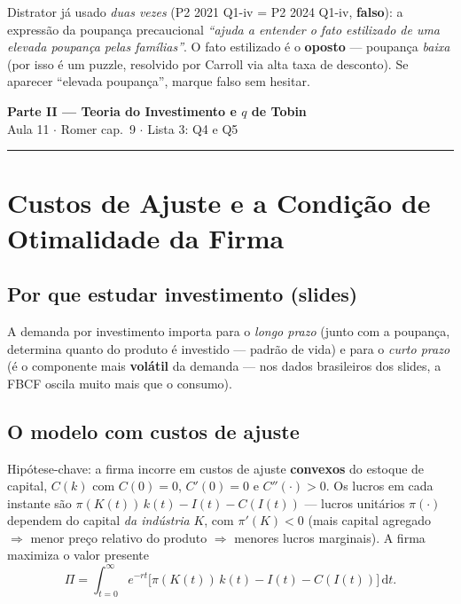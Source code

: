 \documentclass[12pt, a4paper]{article}
\newcommand{\dif}{\mathrm{d}}
\begin{document}
\begin{provabox}[title={Como cai na prova}]
Distrator já usado \emph{duas vezes} (P2 2021 Q1-iv = P2 2024 Q1-iv,
\textbf{falso}): a expressão da poupança precaucional \emph{``ajuda a entender
o fato estilizado de uma elevada poupança pelas famílias''}. O fato estilizado
é o \textbf{oposto} --- poupança \emph{baixa} (por isso é um puzzle, resolvido
por Carroll via alta taxa de desconto). Se aparecer ``elevada poupança'',
marque falso sem hesitar.
\end{provabox}

\newpage
\begin{center}
{\LARGE\bfseries\color{orangerbc} Parte II --- Teoria do Investimento e $q$ de Tobin}\\[0.2em]
{\normalsize\color{grayrbc} Aula 11 $\cdot$ Romer cap.\ 9 $\cdot$ Lista 3: Q4 e Q5}\\[0.2em]
\rule{\linewidth}{0.8pt}
\end{center}

\section{Custos de Ajuste e a Condição de Otimalidade da Firma}

\subsection{Por que estudar investimento (slides)}

A demanda por investimento importa para o \emph{longo prazo} (junto com a
poupança, determina quanto do produto é investido --- padrão de vida) e para o
\emph{curto prazo} (é o componente mais \textbf{volátil} da demanda --- nos
dados brasileiros dos slides, a FBCF oscila muito mais que o consumo).

\subsection{O modelo com custos de ajuste}

Hipótese-chave: a firma incorre em custos de ajuste \textbf{convexos} do
estoque de capital, $C(k)$ com $C(0)=0$, $C'(0)=0$ e $C''(\cdot)>0$. Os lucros
em cada instante são $\pi(K(t))\,k(t) - I(t) - C(I(t))$ --- lucros unitários
$\pi(\cdot)$ dependem do capital \emph{da indústria} $K$, com $\pi'(K)<0$
(mais capital agregado $\Rightarrow$ menor preço relativo do produto
$\Rightarrow$ menores lucros marginais). A firma maximiza o valor presente
\[
\Pi = \int_{t=0}^{\infty}
e^{-rt}\bigl[\pi(K(t))\,k(t) - I(t) - C(I(t))\bigr]\,\dif t.
\]
\end{document}
